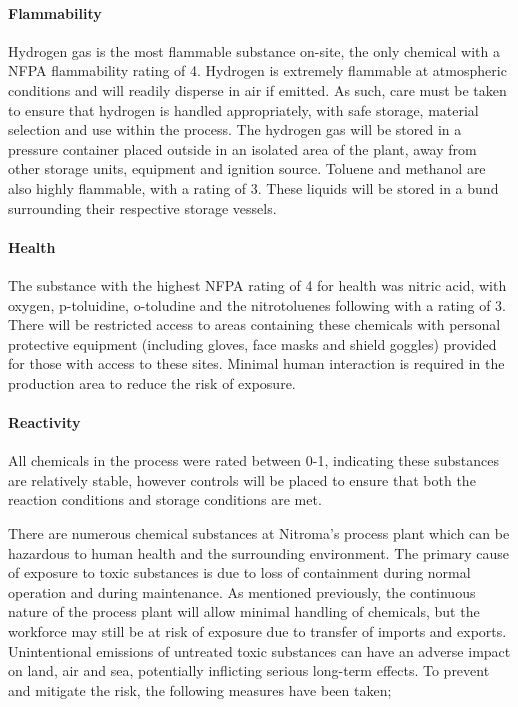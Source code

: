 \paragraph{Flammability}

Hydrogen gas is the most flammable substance on-site, the only chemical with a NFPA flammability rating of 4.  Hydrogen is extremely flammable at atmospheric conditions and will readily disperse in air if emitted. As such, care must be taken to ensure that hydrogen is handled appropriately, with safe storage, material selection and use within the process. The hydrogen gas will be stored in a pressure container placed outside in an isolated area of the plant, away from other storage units, equipment and ignition source.  Toluene and methanol are also highly flammable, with a rating of 3. These liquids will be stored in a bund surrounding their respective storage vessels. 



\paragraph{Health}

The substance with the highest NFPA rating of 4 for health was nitric acid, with oxygen, p-toluidine, o-toludine and the nitrotoluenes  following with a rating of 3. There will be restricted access to areas containing these chemicals with personal protective equipment (including gloves, face masks and shield goggles) provided for those with access to these sites. Minimal human interaction is required in the production area to reduce the risk of exposure.

\paragraph{Reactivity}

All chemicals in the process were rated between 0-1, indicating these substances are relatively stable, however controls will be placed to ensure that both the reaction conditions and storage conditions are met. 

There are numerous chemical substances at Nitroma's process plant which can be hazardous to human health and the surrounding environment. The primary cause of exposure to toxic substances is due to loss of containment during normal operation and during maintenance. As mentioned previously, the continuous nature of the process plant will allow minimal handling of chemicals, but the workforce may still be at risk of exposure due to transfer of imports and exports. Unintentional emissions of untreated toxic substances can have an adverse impact on land, air and sea, potentially inflicting serious long-term effects. To prevent and mitigate the risk, the following measures have been taken;

